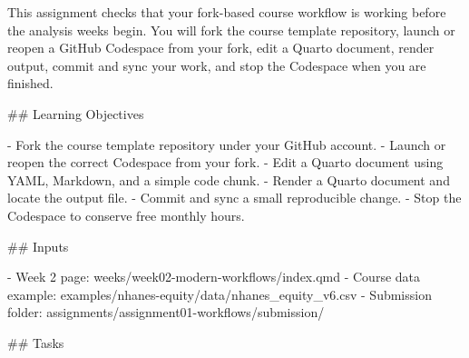 \documentclass[
  letterpaper,
  DIV=11,
  numbers=noendperiod,
  oneside]{scrreprt}
\newenvironment{Shaded}{\begin{snugshade}}{\end{snugshade}}
\newcommand{\FunctionTok}[1]{\textcolor[rgb]{0.28,0.35,0.67}{#1}}
\newcommand{\InformationTok}[1]{\textcolor[rgb]{0.37,0.37,0.37}{#1}}
\newcommand{\NormalTok}[1]{\textcolor[rgb]{0.00,0.23,0.31}{#1}}
\newcommand{\SpecialStringTok}[1]{\textcolor[rgb]{0.13,0.47,0.30}{#1}}
\begin{document}
\begin{Shaded}
\begin{Highlighting}[numbers=left,,]
\NormalTok{This assignment checks that your fork{-}based course workflow is working before the analysis weeks begin. You will fork the course template repository, launch or reopen a GitHub Codespace from your fork, edit a Quarto document, render output, commit and sync your work, and stop the Codespace when you are finished.}

\FunctionTok{\#\# Learning Objectives}

\SpecialStringTok{{-} }\NormalTok{Fork the course template repository under your GitHub account.}
\SpecialStringTok{{-} }\NormalTok{Launch or reopen the correct Codespace from your fork.}
\SpecialStringTok{{-} }\NormalTok{Edit a Quarto document using YAML, Markdown, and a simple code chunk.}
\SpecialStringTok{{-} }\NormalTok{Render a Quarto document and locate the output file.}
\SpecialStringTok{{-} }\NormalTok{Commit and sync a small reproducible change.}
\SpecialStringTok{{-} }\NormalTok{Stop the Codespace to conserve free monthly hours.}

\FunctionTok{\#\# Inputs}

\SpecialStringTok{{-} }\NormalTok{Week 2 page: }\InformationTok{\textasciigrave{}weeks/week02{-}modern{-}workflows/index.qmd\textasciigrave{}}
\SpecialStringTok{{-} }\NormalTok{Course data example: }\InformationTok{\textasciigrave{}examples/nhanes{-}equity/data/nhanes\_equity\_v6.csv\textasciigrave{}}
\SpecialStringTok{{-} }\NormalTok{Submission folder: }\InformationTok{\textasciigrave{}assignments/assignment01{-}workflows/submission/\textasciigrave{}}

\FunctionTok{\#\# Tasks}


\end{Highlighting}
\end{Shaded}
\end{document}
